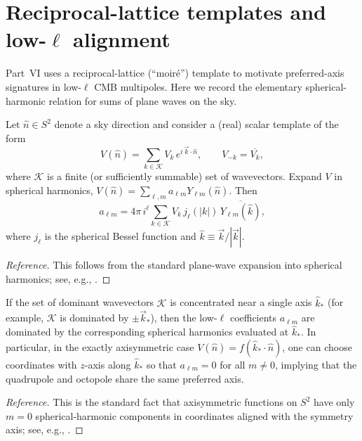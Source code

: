 \section{Reciprocal-lattice templates and \texorpdfstring{low-$\ell$}{low-l} alignment}
\label{app:moire_cmb}
Part~VI uses a reciprocal-lattice (``moir\'e'') template to motivate preferred-axis signatures in low-$\ell$ CMB multipoles. Here we record the elementary spherical-harmonic relation for sums of plane waves on the sky.

\begin{proposition}
\label{prop:plane_wave_harmonics}
Let $\hat{n}\in S^2$ denote a sky direction and consider a (real) scalar template of the form
\begin{equation}
    V(\hat n)=\sum_{k\in\mathcal{K}} V_k\,e^{i\,\vec{k}\cdot \hat n},\qquad V_{-k}=\overline{V_k},
\end{equation}
where $\mathcal{K}$ is a finite (or sufficiently summable) set of wavevectors. Expand $V$ in spherical harmonics, $V(\hat n)=\sum_{\ell,m} a_{\ell m}Y_{\ell m}(\hat n)$. Then
\begin{equation}
    a_{\ell m} = 4\pi\, i^{\ell}\sum_{k\in\mathcal{K}} V_k\, j_{\ell}(|k|)\,\overline{Y_{\ell m}(\hat{k})},
\end{equation}
where $j_{\ell}$ is the spherical Bessel function and $\hat{k}\equiv \vec{k}/|\vec{k}|$.
\end{proposition}
\begin{proof}[Reference]
This follows from the standard plane-wave expansion into spherical harmonics; see, e.g., \cite{ArfkenWeberHarris2013}.
\end{proof}

\begin{corollary}
\label{cor:axis_alignment}
If the set of dominant wavevectors $\mathcal{K}$ is concentrated near a single axis $\hat{k}_\ast$ (for example, $\mathcal{K}$ is dominated by $\pm \vec{k}_\ast$), then the low-$\ell$ coefficients $a_{\ell m}$ are dominated by the corresponding spherical harmonics evaluated at $\hat{k}_\ast$. In particular, in the exactly axisymmetric case $V(\hat n)=f(\hat{k}_\ast\cdot \hat n)$, one can choose coordinates with $z$-axis along $\hat{k}_\ast$ so that $a_{\ell m}=0$ for all $m\neq 0$, implying that the quadrupole and octopole share the same preferred axis.
\end{corollary}
\begin{proof}[Reference]
This is the standard fact that axisymmetric functions on $S^2$ have only $m=0$ spherical-harmonic components in coordinates aligned with the symmetry axis; see, e.g., \cite{ArfkenWeberHarris2013}.
\end{proof}

